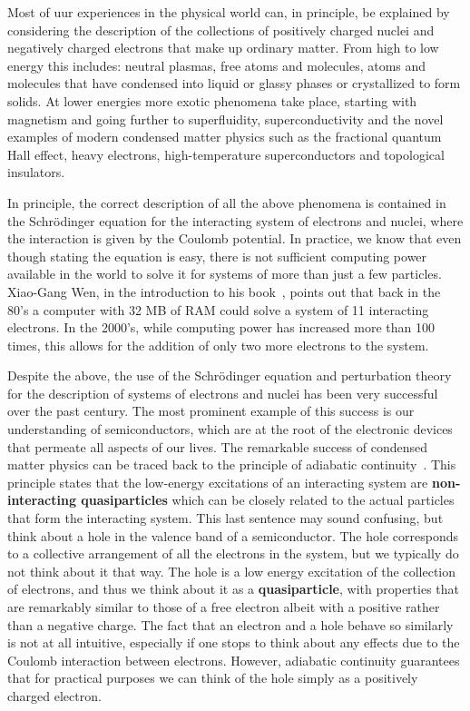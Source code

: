 \documentclass[oneside,11pt]{memoir}
\begin{document}
Most of uur experiences in the physical world can, in principle, be explained
by considering the description of the collections of positively charged nuclei
and negatively charged electrons that make up ordinary matter.    From high to
low energy this includes: neutral plasmas,  free atoms and molecules, atoms and
molecules that have condensed into liquid or glassy phases or crystallized to
form solids.   At lower energies more exotic phenomena take place, starting
with magnetism and going further to superfluidity, superconductivity and the
novel examples of modern condensed matter physics such as the fractional
quantum Hall effect, heavy electrons, high-temperature superconductors and
topological insulators.

In principle,  the correct description of all the above phenomena is contained
in the Schr\"{o}dinger equation for the interacting system of electrons and
nuclei,  where the interaction is given by the Coulomb potential. In practice,
we know that even though stating the equation is easy, there is not sufficient
computing power available in the world to solve it for systems of more than
just a few particles.  Xiao-Gang Wen, in the introduction to his
book~\cite{wen2004quantum}, points out that back in the 80's a computer with 32
MB of RAM could solve a system of 11 interacting electrons.  In the 2000's,
while computing power has increased more than 100 times, this allows for the
addition of only two more electrons to the system.  

Despite the above,  the use of the Schr\"{o}dinger equation and perturbation
theory for the description of  systems of electrons and nuclei has been very
successful over the past century.  The most prominent example of this success
is our understanding of semiconductors, which are at the root of the electronic
devices that permeate all aspects of our lives.  The remarkable success of
condensed matter physics can be traced back to the principle of adiabatic
continuity~\cite{altland2010condensed}. This principle  states that  the
low-energy excitations of an interacting system  are  \textbf{non-interacting
quasiparticles} which can be closely related to the actual particles that form
the interacting system.   This last sentence may sound confusing, but think
about a hole in the valence band of a semiconductor.  The hole corresponds to a
collective arrangement of all the electrons in the system, but we typically do
not think about it that way.  The hole is a low energy excitation of the
collection of electrons, and thus we think about it as a
\textbf{quasiparticle}, with properties that are remarkably similar to those of
a free electron albeit with a positive rather than a negative charge.  The fact
that an electron and a hole behave so similarly is not at all intuitive,
especially if one stops to think about any effects due to the  Coulomb
interaction between electrons. However, adiabatic continuity guarantees that
for practical purposes we can think of the hole simply as a positively charged
electron.  
\end{document}
